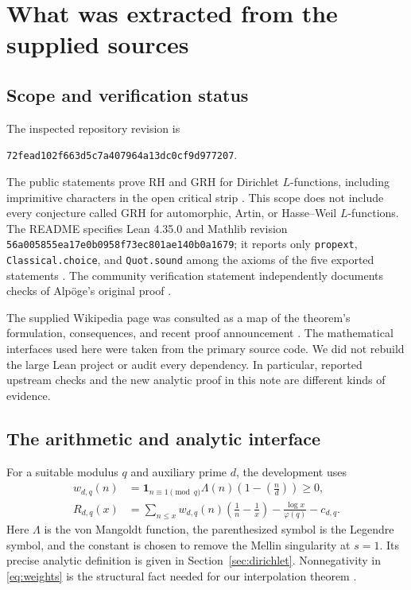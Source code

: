 \documentclass[11pt]{article}
\theoremstyle{definition}
\begin{document}
\section{What was extracted from the supplied sources}
\label{sec:sources}

\subsection{Scope and verification status}

The inspected repository revision is
\begin{center}\small
\texttt{72fead102f663d5c7a407964a13dc0cf9d977207}.
\end{center}
The public statements prove RH and GRH for Dirichlet \(L\)-functions,
including imprimitive characters in the open critical strip
\cite{statements,main}. This scope does not include every conjecture
called GRH for automorphic, Artin, or Hasse--Weil \(L\)-functions.
The README specifies Lean 4.35.0 and Mathlib revision
\texttt{56a005855ea17e0b0958f73ec801ae140b0a1679}; it reports only
\texttt{propext}, \texttt{Classical.choice}, and \texttt{Quot.sound}
among the axioms of the five exported statements \cite{repo}.
The community verification statement independently documents checks of
Alp\"oge's original proof \cite{leancommunity}.

The supplied Wikipedia page was consulted as a map of the theorem's
formulation, consequences, and recent proof announcement \cite{wiki}.
The mathematical interfaces used here were taken from the primary source
code. We did not rebuild the large Lean project or audit every dependency.
In particular, reported upstream checks and the new analytic proof in this
note are different kinds of evidence.

\subsection{The arithmetic and analytic interface}

For a suitable modulus \(q\) and auxiliary prime \(d\), the development uses
\begin{align}
 w_{d,q}(n)&=\mathbf1_{n\equiv1\pmod q}\Lambda(n)
       \left(1-\left(\frac nd\right)\right)\geq0,\label{eq:weights}\\
 R_{d,q}(x)&=\sum_{n\leq x}w_{d,q}(n)
       \left(\frac1n-\frac1x\right)
       -\frac{\log x}{\varphi(q)}-c_{d,q}.\label{eq:repo-remainder}
\end{align}
Here \(\Lambda\) is the von Mangoldt function, the parenthesized symbol is
the Legendre symbol, and the constant is chosen to remove the Mellin
singularity at \(s=1\). Its precise analytic definition is given in
Section~\ref{sec:dirichlet}. Nonnegativity in \eqref{eq:weights} is the
structural fact needed for our interpolation theorem \cite{primeerror}.
\end{document}
